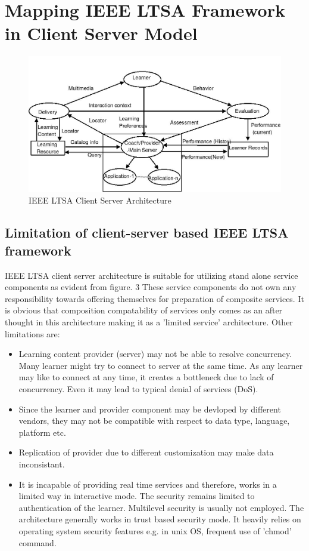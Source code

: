 \section{Mapping IEEE LTSA Framework in Client Server Model}
 \blindtext
\begin{figure}[htb]
 \centering
 \includegraphics[scale=.5]{IeeeLtsa.jpeg}
 \caption{IEEE LTSA Client Server Architecture\cite{ltsa}}
\end{figure}

\subsection{Limitation of client-server based IEEE LTSA framework}
IEEE LTSA client server architecture is suitable for utilizing stand alone service
components as evident from figure. 3 These service components do not own any responsibility towards offering themselves for preparation of composite services. It is
obvious that composition compatability of services only comes as an after thought
in this architecture making it as a ’limited service’ architecture. Other limitations
are:
\begin{itemize}
 \item  Learning content provider (server) may not be able to resolve concurrency.
Many learner might try to connect to server at the same time. As any learner may
like to connect at any time, it creates a bottleneck due to lack of concurrency. Even
it may lead to typical denial of services (DoS).
 \item Since the learner and provider component may be devloped by different vendors, they may not be compatible with respect to data type, language, platform
etc.
 \item Replication of provider due to different customization may make data inconsistant.
 \item It is incapable of providing real time services and therefore, works in a limited
way in interactive mode. The security remains limited to authentication of the
learner. Multilevel security is usually not employed. The architecture generally
works in trust based security mode. It heavily relies on operating system security
features e.g. in unix OS, frequent use of 'chmod' command.
\end{itemize}
